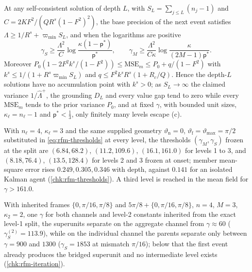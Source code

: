 \begin{corollary}\label{cor:rfm-depth}
At any self-consistent solution of depth $L$, with $S_L=\sum_{j\le L}(n_j-1)$ and $C=2KF^2/(QR^s(1-F^2)^2)$, the base precision of the next event satisfies $\Lambda\ge1/R^s+\varpi_{\min}S_L$, and when the logarithms are positive
\begin{equation}\label{eq:rfm-depth}
\gamma_S\ge\frac{\Lambda^2}{C}\log\frac{\kappa(1-\mathsf p^\ast)}{\mathsf p^\ast},\qquad\gamma_M\ge\frac{\Lambda^2}{C\kappa}\log\frac{\kappa}{(2M-1)\mathsf p^\ast}.
\end{equation}
Moreover $P_0(1-2F^2k^s/(1-F^2))\le\mathrm{MSE}_m\le P_0+q/(1-F^2)$ with $k^s\le1/(1+R^s\varpi_{\min}S_L)$ and $q\le F^2k^sR^s(1+R_c/Q)$. Hence the depth-$L$ solutions have no accumulation point with $k^s>0$; as $S_L\to\infty$ the claimed variance $1/\hat\Lambda^+$, the grounding $D_L$ and every value gap tend to zero while every $\mathrm{MSE}_m$ tends to the prior variance $P_0$, and at fixed $\gamma$, with bounded unit sizes, $\kappa_\ell=n_\ell-1$ and $\mathsf p^\ast<\frac13$, only finitely many levels escape (c).
\end{corollary}

\begin{observation}\label{obs:rfm-levels}
With $n_\ell=4$, $\kappa_\ell=3$ and the same supplied geometry $\vartheta_{\mathrm n}=0$, $\vartheta_{\mathrm f}=\vartheta_{\max}=\pi/2$ substituted in \eqref{eq:rfm-thresholds} at every level, the thresholds $(\gamma_M,\gamma_S)$ frozen at the split are $(6.84,68.2)$, $(11.2,109.6)$, $(16.1,161.0)$ for levels 1 to 3, and $(8.18,76.4)$, $(13.5,128.4)$ for levels 2 and 3 frozen at onset; member mean-square error rises $0.249,0.305,0.346$ with depth, against $0.141$ for an isolated Kalman agent (\cref{chk:rfm-thresholds}). A third level is reached in the mean field for $\gamma>161.0$.
\end{observation}

\begin{observation}\label{obs:rfm-ordering}
With inherited frames $\{0,\pi/16,\pi/8\}$ and $5\pi/8+\{0,\pi/16,\pi/8\}$, $n=4$, $M=3$, $\kappa_2=2$, one $\gamma$ for both channels and level-2 constants inherited from the exact level-1 split, the superunits separate on the aggregate channel from $\gamma\approx60$ ($\gamma_S^{(2)}=113.9$), while on the individual channel the parents separate only between $\gamma=900$ and $1300$ ($\gamma_S=1853$ at mismatch $\pi/16$); below that the first event already produces the bridged superunit and no intermediate level exists (\cref{chk:rfm-iteration}).
\end{observation}

